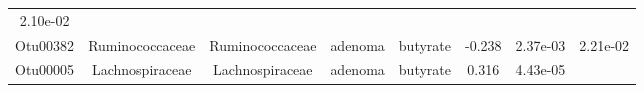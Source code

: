\documentclass[11pt,]{article}
\begin{document}
\begin{longtable}[]{@{}cccccccc@{}}
\begin{minipage}[t]{0.08\columnwidth}
2.10e-02\strut
\end{minipage}\tabularnewline
\begin{minipage}[t]{0.08\columnwidth}\centering\strut
Otu00382\strut
\end{minipage} & \begin{minipage}[t]{0.15\columnwidth}\centering\strut
Ruminococcaceae\strut
\end{minipage} & \begin{minipage}[t]{0.15\columnwidth}\centering\strut
Ruminococcaceae\strut
\end{minipage} & \begin{minipage}[t]{0.08\columnwidth}\centering\strut
adenoma\strut
\end{minipage} & \begin{minipage}[t]{0.09\columnwidth}\centering\strut
butyrate\strut
\end{minipage} & \begin{minipage}[t]{0.07\columnwidth}\centering\strut
-0.238\strut
\end{minipage} & \begin{minipage}[t]{0.08\columnwidth}\centering\strut
2.37e-03\strut
\end{minipage} & \begin{minipage}[t]{0.08\columnwidth}\centering\strut
2.21e-02\strut
\end{minipage}\tabularnewline
\begin{minipage}[t]{0.08\columnwidth}\centering\strut
Otu00005\strut
\end{minipage} & \begin{minipage}[t]{0.15\columnwidth}\centering\strut
Lachnospiraceae\strut
\end{minipage} & \begin{minipage}[t]{0.15\columnwidth}\centering\strut
Lachnospiraceae\strut
\end{minipage} & \begin{minipage}[t]{0.08\columnwidth}\centering\strut
adenoma\strut
\end{minipage} & \begin{minipage}[t]{0.09\columnwidth}\centering\strut
butyrate\strut
\end{minipage} & \begin{minipage}[t]{0.07\columnwidth}\centering\strut
0.316\strut
\end{minipage} & \begin{minipage}[t]{0.08\columnwidth}\centering\strut
4.43e-05\strut
\end{minipage} & \begin{minipage}[t]{0.08\columnwidth}\centering\strut

\end{minipage}
\end{longtable}
\end{document}
